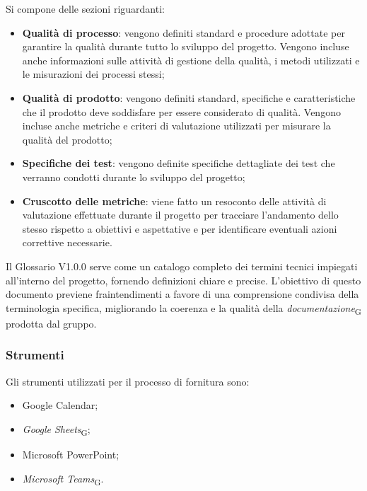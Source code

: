 Si compone delle sezioni riguardanti:
\begin{itemize}
    \item \textbf{Qualità di processo}: vengono definiti standard e procedure adottate per garantire la qualità durante tutto lo sviluppo del progetto. Vengono incluse anche informazioni sulle attività di gestione della qualità, i metodi utilizzati e le misurazioni dei processi stessi;
    \item \textbf{Qualità di prodotto}: vengono definiti standard, specifiche e caratteristiche che il prodotto deve soddisfare per essere considerato di qualità. Vengono incluse anche metriche e criteri di valutazione utilizzati per misurare la qualità del prodotto;
    \item \textbf{Specifiche dei test}: vengono definite specifiche dettagliate dei test che verranno condotti durante lo sviluppo del progetto;
    \item \textbf{Cruscotto delle metriche}: viene fatto un resoconto delle attività di valutazione effettuate durante il progetto per tracciare l'andamento dello stesso rispetto a obiettivi e aspettative e per identificare eventuali azioni correttive necessarie.
\end{itemize}

Il Glossario V1.0.0 serve come un catalogo completo dei termini tecnici impiegati all'interno del progetto, fornendo definizioni chiare e precise. L'obiettivo di questo documento previene fraintendimenti a favore di una comprensione condivisa della terminologia specifica, migliorando la coerenza e la qualità della \textit{documentazione}\textsubscript{G} prodotta dal gruppo.

\subsubsection{Strumenti}
Gli strumenti utilizzati per il processo di fornitura sono:
\begin{itemize}
    \item Google Calendar;
    \item \textit{Google Sheets}\textsubscript{G};
    \item Microsoft PowerPoint;
    \item \textit{Microsoft Teams}\textsubscript{G}.
\end{itemize}